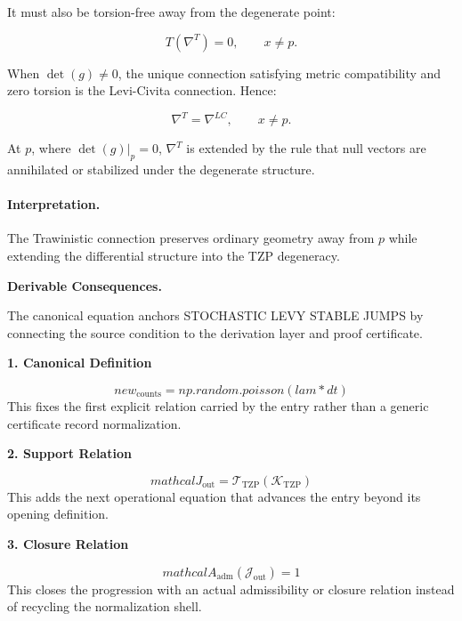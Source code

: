 It must also be torsion-free away from the degenerate point:

\begin{equation}
T(\nabla^{T})=0,
\qquad x\neq p .
\end{equation}

When $\det(g)\neq 0$, the unique connection satisfying metric compatibility and zero torsion is the Levi-Civita connection. Hence:

\begin{equation}
\nabla^{T}=\nabla^{LC},
\qquad x\neq p .
\end{equation}

At $p$, where $\det(g)|_p=0$, $\nabla^{T}$ is extended by the rule that null vectors are annihilated or stabilized under the degenerate structure.

\paragraph{Interpretation.}
The Trawinistic connection preserves ordinary geometry away from $p$ while extending the differential structure into the TZP degeneracy.

\par\vspace{0.35em}
\noindent\textbf{Derivable Consequences.}\quad
\begingroup
\footnotesize
\raggedright
The canonical equation anchors STOCHASTIC LEVY STABLE JUMPS by connecting the source condition to the derivation layer and proof certificate.
\par\endgroup

\noindent\textbf{1. Canonical Definition}\par
\[
new_{\mathrm{counts}} = np.random.poisson(lam*dt)
\]
\noindent This fixes the first explicit relation carried by the entry rather than a generic certificate record normalization.\par
\noindent\textbf{2. Support Relation}\par
\[
mathcal{J}_{\mathrm{out}} = \mathcal{T}_{\mathrm{TZP}}\!\left(\mathcal{K}_{\mathrm{TZP}}\right)
\]
\noindent This adds the next operational equation that advances the entry beyond its opening definition.\par
\noindent\textbf{3. Closure Relation}\par
\[
mathcal{A}_{\mathrm{adm}}\!\left(\mathcal{J}_{\mathrm{out}}\right)=1
\]
\noindent This closes the progression with an actual admissibility or closure relation instead of recycling the normalization shell.\par

